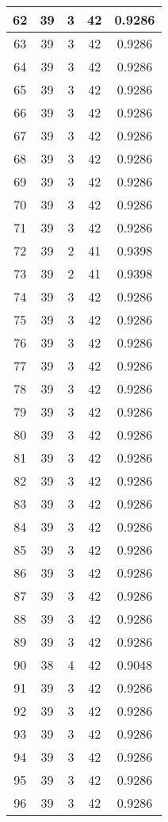 \documentclass[letterpaper, 12pt]{article}
\begin{document}
\begin{longtable}{|c|c|c|c|c|}
\hline
62 & 39 & 3 & 42 & 0.9286 \\
\hline
63 & 39 & 3 & 42 & 0.9286 \\
\hline
64 & 39 & 3 & 42 & 0.9286 \\
\hline
65 & 39 & 3 & 42 & 0.9286 \\
\hline
66 & 39 & 3 & 42 & 0.9286 \\
\hline
67 & 39 & 3 & 42 & 0.9286 \\
\hline
68 & 39 & 3 & 42 & 0.9286 \\
\hline
69 & 39 & 3 & 42 & 0.9286 \\
\hline
70 & 39 & 3 & 42 & 0.9286 \\
\hline
71 & 39 & 3 & 42 & 0.9286 \\
\hline
72 & 39 & 2 & 41 & 0.9398 \\
\hline
73 & 39 & 2 & 41 & 0.9398 \\
\hline
74 & 39 & 3 & 42 & 0.9286 \\
\hline
75 & 39 & 3 & 42 & 0.9286 \\
\hline
76 & 39 & 3 & 42 & 0.9286 \\
\hline
77 & 39 & 3 & 42 & 0.9286 \\
\hline
78 & 39 & 3 & 42 & 0.9286 \\
\hline
79 & 39 & 3 & 42 & 0.9286 \\
\hline
80 & 39 & 3 & 42 & 0.9286 \\
\hline
81 & 39 & 3 & 42 & 0.9286 \\
\hline
82 & 39 & 3 & 42 & 0.9286 \\
\hline
83 & 39 & 3 & 42 & 0.9286 \\
\hline
84 & 39 & 3 & 42 & 0.9286 \\
\hline
85 & 39 & 3 & 42 & 0.9286 \\
\hline
86 & 39 & 3 & 42 & 0.9286 \\
\hline
87 & 39 & 3 & 42 & 0.9286 \\
\hline
88 & 39 & 3 & 42 & 0.9286 \\
\hline
89 & 39 & 3 & 42 & 0.9286 \\
\hline
90 & 38 & 4 & 42 & 0.9048 \\
\hline
91 & 39 & 3 & 42 & 0.9286 \\
\hline
92 & 39 & 3 & 42 & 0.9286 \\
\hline
93 & 39 & 3 & 42 & 0.9286 \\
\hline
94 & 39 & 3 & 42 & 0.9286 \\
\hline
95 & 39 & 3 & 42 & 0.9286 \\
\hline
96 & 39 & 3 & 42 & 0.9286 \\

\end{longtable}
\end{document}
